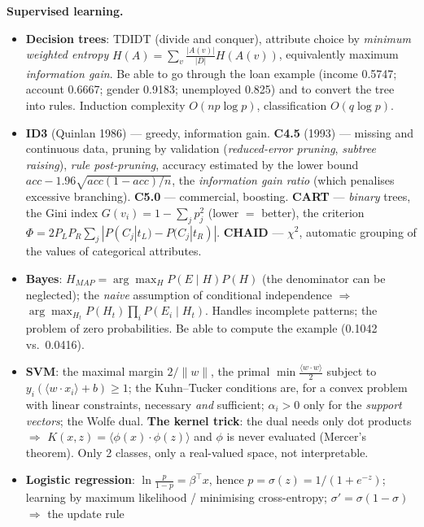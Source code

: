 \documentclass[11pt,a4paper]{article}
\theoremstyle{definition}
\begin{document}
\textbf{Supervised learning.}
\begin{itemize}
\item \textbf{Decision trees}: TDIDT (divide and conquer), attribute choice by \emph{minimum
      weighted entropy} $H(A)=\sum_v\frac{|A(v)|}{|D|}H(A(v))$, equivalently maximum
      \emph{information gain}. Be able to go through the loan example (income 0.5747; account
      0.6667; gender 0.9183; unemployed 0.825) and to convert the tree into rules. Induction
      complexity $O(np\log p)$, classification $O(q\log p)$.
\item \textbf{ID3} (Quinlan 1986) --- greedy, information gain. \textbf{C4.5} (1993) --- missing
      and continuous data, pruning by validation (\emph{reduced-error pruning}, \emph{subtree
      raising}), \emph{rule post-pruning}, accuracy estimated by the lower bound
      $\mathit{acc}-1.96\sqrt{\mathit{acc}(1-\mathit{acc})/n}$, the \emph{information gain ratio}
      (which penalises excessive branching). \textbf{C5.0} --- commercial, boosting.
      \textbf{CART} --- \emph{binary} trees, the Gini index $G(v_i)=1-\sum_j p_j^2$ (lower $=$
      better), the criterion $\Phi=2P_LP_R\sum_j|P(C_j|t_L)-P(C_j|t_R)|$. \textbf{CHAID} ---
      $\chi^2$, automatic grouping of the values of categorical attributes.
\item \textbf{Bayes}: $H_{MAP}=\arg\max_H P(E\mid H)P(H)$ (the denominator can be neglected); the
      \emph{naive} assumption of conditional independence $\Rightarrow$
      $\arg\max_{H_t}P(H_t)\prod_i P(E_i\mid H_t)$. Handles incomplete patterns; the problem of
      zero probabilities. Be able to compute the example (0.1042 vs.\ 0.0416).
\item \textbf{SVM}: the maximal margin $2/\|w\|$, the primal $\min\frac{\langle w\cdot
      w\rangle}{2}$ subject to $y_i(\langle w\cdot x_i\rangle+b)\ge 1$; the Kuhn--Tucker conditions
      are, for a convex problem with linear constraints, necessary \emph{and} sufficient;
      $\alpha_i>0$ only for the \emph{support vectors}; the Wolfe dual. \textbf{The kernel trick}:
      the dual needs only dot products $\Rightarrow$
      $K(x,z)=\langle\phi(x)\cdot\phi(z)\rangle$ and $\phi$ is never evaluated (Mercer's theorem).
      Only 2 classes, only a real-valued space, not interpretable.
\item \textbf{Logistic regression}: $\ln\frac{p}{1-p}=\beta^{\!\top}x$, hence
      $p=\sigma(z)=1/(1+e^{-z})$; learning by maximum likelihood / minimising cross-entropy;
      $\sigma'=\sigma(1-\sigma)$ $\Rightarrow$ the update rule

\end{itemize}
\end{document}
